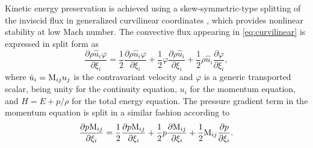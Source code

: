 \documentclass[12pt]{article}
\begin{document}
Kinetic energy preservation is achieved using a skew-symmetric-type splitting of the inviscid flux in generalized curvilinear coordinates \cite{pirozzoli2011stabilized}, which provides nonlinear stability at low Mach number. The convective flux appearing in \eqref{eq:curvilinear} is expressed in split form as
\begin{equation}
\frac{\partial\rho\hat{u}_i\varphi}{\partial\xi_i}=\frac{1}{2}\frac{\partial\rho\hat{u}_i\varphi}{\partial\xi_i}+\frac{1}{2}\varphi\frac{\partial\rho\hat{u}_i}{\partial\xi_i}+\frac{1}{2}\rho\hat{u}_i\frac{\partial\varphi}{\partial\xi_i},
\end{equation}
where $\hat{u}_i={\rm M}_{ij}u_j$ is the contravariant velocity and $\varphi$ is a generic transported scalar, being unity for the continuity equation, $u_i$ for the momentum equation, and $H=E+p/\rho$ for the total energy equation. The pressure gradient term in the momentum equation is split in a similar fashion according to
\begin{equation}
\frac{\partial p {\rm M}_{ij}}{\partial \xi_i}=\frac{1}{2}\frac{\partial p {\rm M}_{ij}}{\partial \xi_i}+\frac{1}{2}p\frac{\partial {\rm M}_{ij}}{\partial \xi_i}+\frac{1}{2}{\rm M}_{ij}\frac{\partial p}{\partial \xi_i}.
\end{equation}

\end{document}
